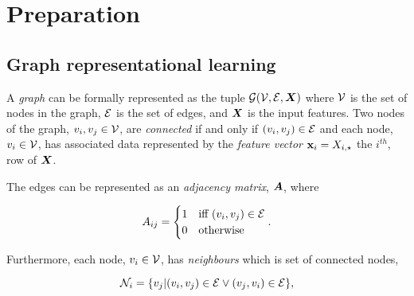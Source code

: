 \chapter{Preparation}


\section{Graph representational learning}
\label{sec:GRL}



A \emph{graph} can be formally represented as the tuple ${\mathcal{G}}({\mathcal{V}}, {\mathcal{E}}, {\bm{X}})$ where ${\mathcal{V}}$ is the set of nodes in the graph, ${\mathcal{E}}$ is the set of edges, and ${\bm{X}}$ is the input features.
Two nodes of the graph, $v_i, v_j \in {\mathcal{V}}$, are \emph{connected} if and only if $(v_i, v_j) \in {\mathcal{E}}$ and
each node, $v_i \in {\mathcal{V}}$, has associated data represented by the \emph{feature vector} ${\textbf{x}}_i = {X}_{i,\star}$ the $i^{th}$, row of ${\bm{X}}$.

The edges can be represented as an \emph{adjacency matrix}, ${\bm{A}}$, where 

\begin{equation}
    \label{eq:adj}
    {A}_{ij} = \begin{cases}1 &\text{iff $(v_i, v_j) \in {\mathcal{E}}$} \\ 0 &\text{otherwise}\end{cases}.
\end{equation}

Furthermore, each node, $v_i \in {\mathcal{V}}$, has \emph{neighbours} which is set of connected nodes,

\begin{equation}
    \label{eq:neighbour}
    {\mathcal{N}}_i = \{v_j | (v_i, v_j) \in {\mathcal{E}} \vee (v_j, v_i) \in {\mathcal{E}}\},
\end{equation}

